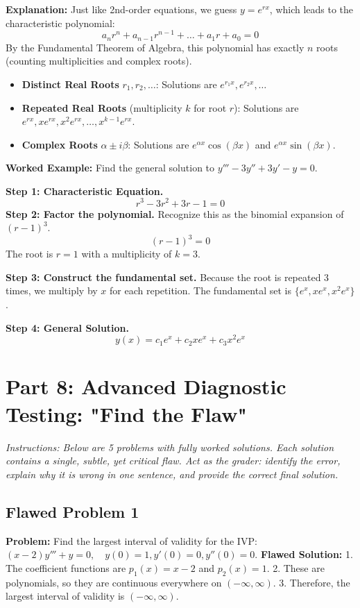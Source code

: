 \documentclass[11pt,letterpaper]{article}
\begin{document}
\textbf{Explanation:}
Just like 2nd-order equations, we guess $y = e^{rx}$, which leads to the characteristic polynomial:
\[ a_n r^n + a_{n-1} r^{n-1} + \dots + a_1 r + a_0 = 0 \]
By the Fundamental Theorem of Algebra, this polynomial has exactly $n$ roots (counting multiplicities and complex roots).
\begin{itemize}
    \item \textbf{Distinct Real Roots} $r_1, r_2, \dots$: Solutions are $e^{r_1 x}, e^{r_2 x}, \dots$
    \item \textbf{Repeated Real Roots} (multiplicity $k$ for root $r$): Solutions are $e^{rx}, xe^{rx}, x^2e^{rx}, \dots, x^{k-1}e^{rx}$.
    \item \textbf{Complex Roots} $\alpha \pm i\beta$: Solutions are $e^{\alpha x}\cos(\beta x)$ and $e^{\alpha x}\sin(\beta x)$.
\end{itemize}

\textbf{Worked Example:}
Find the general solution to $y''' - 3y'' + 3y' - y = 0$.

\textbf{Step 1: Characteristic Equation.}
\[ r^3 - 3r^2 + 3r - 1 = 0 \]
\textbf{Step 2: Factor the polynomial.}
Recognize this as the binomial expansion of $(r - 1)^3$.
\[ (r - 1)^3 = 0 \]
The root is $r = 1$ with a multiplicity of $k = 3$.

\textbf{Step 3: Construct the fundamental set.}
Because the root is repeated 3 times, we multiply by $x$ for each repetition.
The fundamental set is $\{e^x, xe^x, x^2e^x\}$.

\textbf{Step 4: General Solution.}
\[ y(x) = c_1 e^x + c_2 xe^x + c_3 x^2e^x \]

\newpage
\section{Part 8: Advanced Diagnostic Testing: "Find the Flaw"}

\textit{Instructions: Below are 5 problems with fully worked solutions. Each solution contains a single, subtle, yet critical flaw. Act as the grader: identify the error, explain why it is wrong in one sentence, and provide the correct final solution.}

\subsection{Flawed Problem 1}
\textbf{Problem:} Find the largest interval of validity for the IVP: $(x-2)y''' + y = 0, \quad y(0)=1, y'(0)=0, y''(0)=0$.
\textbf{Flawed Solution:}
1. The coefficient functions are $p_1(x) = x-2$ and $p_2(x) = 1$.
2. These are polynomials, so they are continuous everywhere on $(-\infty, \infty)$.
3. Therefore, the largest interval of validity is $(-\infty, \infty)$.
\end{document}
